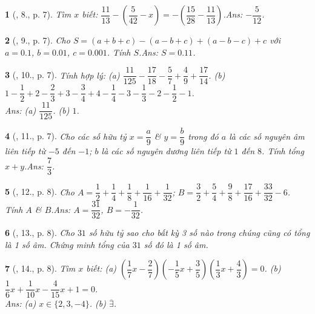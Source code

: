 \documentclass{article}
\newtheorem{baitoan}{}
\begin{document}
\begin{baitoan}[\cite{Tuyen_Toan_7}, 8., p. 7]
	Tìm $x$ biết: $\dfrac{11}{13} - \left(\dfrac{5}{42} - x\right) = -\left(\dfrac{15}{28} - \dfrac{11}{13}\right)$.\hfill{\sf Ans: $-\dfrac{5}{12}$.}
\end{baitoan}

\begin{baitoan}[\cite{Tuyen_Toan_7}, 9., p. 7]
	Cho $S = (a + b + c) - (a - b + c) + (a - b - c) + c$ với $a = 0.1$, $b = 0.01$, $c = 0.001$. Tính $S$.\hfill{\sf Ans: $S = 0.11$.}
\end{baitoan}

\begin{baitoan}[\cite{Tuyen_Toan_7}, 10., p. 7]
	Tính hợp lý: (a) $\dfrac{11}{125} - \dfrac{17}{18} - \dfrac{5}{7} + \dfrac{4}{9} + \dfrac{17}{14}$. (b) $1 - \dfrac{1}{2} + 2 - \dfrac{2}{3} + 3 - \dfrac{3}{4} + 4 - \dfrac{1}{4} - 3 - \dfrac{1}{3} - 2 - \dfrac{1}{2} - 1$.\\\mbox{}\hfill{\sf Ans: (a) $\dfrac{11}{125}$. (b) $1$.}
\end{baitoan}

\begin{baitoan}[\cite{Tuyen_Toan_7}, 11., p. 7]
	Cho các số hữu tỷ $x = \dfrac{a}{9}$ \& $y = \dfrac{b}{9}$ trong đó $a$ là các số nguyên âm liên tiếp từ $-5$ đến $-1$; $b$ là các số nguyên dương liên tiếp từ $1$ đến $8$. Tính tổng $x + y$.\hfill{\sf Ans: $\dfrac{7}{3}$.}
\end{baitoan}

\begin{baitoan}[\cite{Tuyen_Toan_7}, 12., p. 8]
	Cho $A = \dfrac{1}{2} + \dfrac{1}{4} + \dfrac{1}{8} + \dfrac{1}{16} + \dfrac{1}{32}$; $B = \dfrac{3}{2} + \dfrac{5}{4} + \dfrac{9}{8} + \dfrac{17}{16} + \dfrac{33}{32} - 6$. Tính $A$ \& $B$.\hfill{\sf Ans: $A = \dfrac{31}{32}$, $B = -\dfrac{1}{32}$.}
\end{baitoan}

\begin{baitoan}[\cite{Tuyen_Toan_7}, 13., p. 8]
	Cho $31$ số hữu tỷ sao cho bất kỳ 3 số nào trong chúng cũng có tổng là 1 số âm. Chứng minh tổng của $31$ số đó là 1 số âm.
\end{baitoan}

\begin{baitoan}[\cite{Tuyen_Toan_7}, 14., p. 8]
	Tìm $x$ biết: (a) $\left(\dfrac{1}{7}x - \dfrac{2}{7}\right)\left(-\dfrac{1}{5}x + \dfrac{3}{5}\right)\left(\dfrac{1}{3}x + \dfrac{4}{3}\right) = 0$. (b) $\dfrac{1}{6}x + \dfrac{1}{10}x - \dfrac{4}{15}x + 1 = 0$.
	\\\mbox{}\hfill{\sf Ans: (a) $x\in\{2,3,-4\}$. (b) $\overline{\exists}$.}
\end{baitoan}
\end{document}
